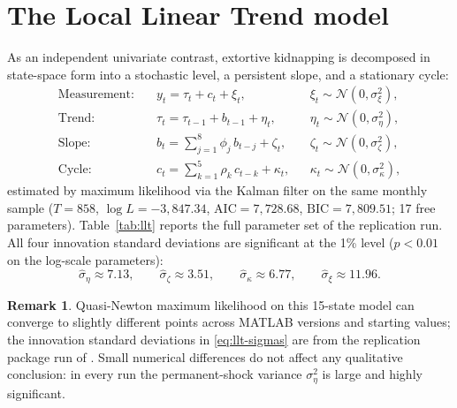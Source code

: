 \documentclass[ecta,nameyear,final,supplement]{econsocart}
\numberwithin{equation}{section}
\numberwithin{table}{section}
\theoremstyle{definition}
\newtheorem{remark}[theorem]{Remark}
\begin{document}
\section{The Local Linear Trend model}
\label{sec:llt}

As an independent univariate contrast, extortive kidnapping is decomposed in
state-space form \citep{Harvey1989} into a stochastic level, a persistent
slope, and a stationary cycle:
\begin{equation}
\begin{aligned}
\text{Measurement:} \quad & y_t = \tau_t + c_t + \xi_t,
&& \xi_t \sim \mathcal{N}(0,\sigma_\xi^2), \\[4pt]
\text{Trend:} \quad & \tau_t = \tau_{t-1} + b_{t-1} + \eta_t,
&& \eta_t \sim \mathcal{N}(0,\sigma_\eta^2), \\[4pt]
\text{Slope:} \quad & b_t = \textstyle\sum_{j=1}^{8}\phi_j\, b_{t-j} + \zeta_t,
&& \zeta_t \sim \mathcal{N}(0,\sigma_\zeta^2), \\[4pt]
\text{Cycle:} \quad & c_t = \textstyle\sum_{k=1}^{5}\rho_k\, c_{t-k} + \kappa_t,
&& \kappa_t \sim \mathcal{N}(0,\sigma_\kappa^2),
\end{aligned}
\label{eq:llt}
\end{equation}
estimated by maximum likelihood via the Kalman filter on the same monthly
sample ($T=858$, $\log L = -3{,}847.34$, $\mathrm{AIC}=7{,}728.68$,
$\mathrm{BIC}=7{,}809.51$; 17 free parameters). Table~\ref{tab:llt} reports
the full parameter set of the replication run. All four innovation standard
deviations are significant at the 1\% level ($p<0.01$ on the log-scale
parameters):
\begin{equation}
\hat\sigma_\eta \approx 7.13, \qquad
\hat\sigma_\zeta \approx 3.51, \qquad
\hat\sigma_\kappa \approx 6.77, \qquad
\hat\sigma_\xi \approx 11.96 .
\label{eq:llt-sigmas}
\end{equation}

\begin{remark}
Quasi-Newton maximum likelihood on this 15-state model can converge to
slightly different points across MATLAB versions and starting values; the
innovation standard deviations in \eqref{eq:llt-sigmas} are from the
replication package run of . Small numerical
differences do not affect any qualitative conclusion: in every run the
permanent-shock variance $\sigma_\eta^2$ is large and highly significant.
\end{remark}
\end{document}
